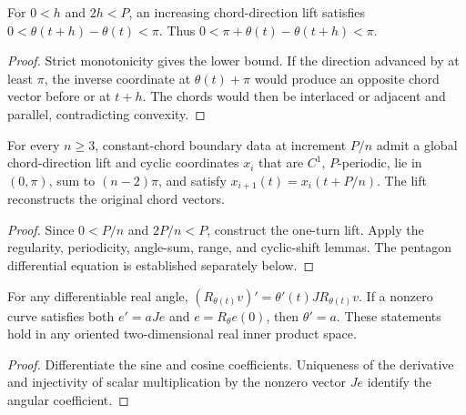 \begin{proposition}
\label{prop:chord-angle-range}
\leanok
{}
For $0<h$ and $2h<P$, an increasing chord-direction lift satisfies
$0<\theta(t+h)-\theta(t)<\pi$. Thus
$0<\pi+\theta(t)-\theta(t+h)<\pi$.
\end{proposition}
\begin{proof}
\leanok
Strict monotonicity gives the lower bound. If the direction advanced by
at least $\pi$, the inverse coordinate at $\theta(t)+\pi$ would produce
an opposite chord vector before or at $t+h$. The chords would then be
interlaced or adjacent and parallel, contradicting convexity.
\end{proof}

\begin{proposition}
\label{prop:cyclic-angle-extraction}
\leanok
{}
For every $n\geq3$, constant-chord boundary data at increment $P/n$ admit
a global chord-direction lift and cyclic coordinates $x_i$ that are $C^1$,
$P$-periodic, lie in $(0,\pi)$, sum to $(n-2)\pi$, and satisfy
$x_{i+1}(t)=x_i(t+P/n)$. The lift reconstructs the original chord vectors.
\end{proposition}
\begin{proof}
\leanok
Since $0<P/n$ and $2P/n<P$, construct the one-turn lift. Apply the
regularity, periodicity, angle-sum, range, and cyclic-shift lemmas.
The pentagon differential equation is established separately below.
\end{proof}

\begin{lemma}
\label{lem:rotation-derivative}
\leanok
{}
For any differentiable real angle, $(R_{\theta(t)}v)'=
\theta'(t)JR_{\theta(t)}v$. If a nonzero curve satisfies both
$e'=aJe$ and $e=R_\theta e(0)$, then $\theta'=a$.
These statements hold in any oriented two-dimensional real inner product space.
\end{lemma}
\begin{proof}
\leanok
Differentiate the sine and cosine coefficients. Uniqueness of the derivative
and injectivity of scalar multiplication by the nonzero vector $Je$ identify
the angular coefficient.
\end{proof}


